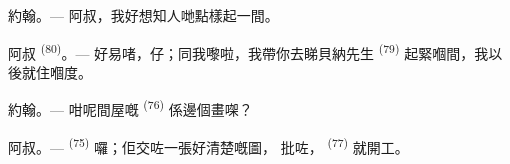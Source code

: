 %
%
%
%
%

\VUsaut{6.0mm}
\VUsaut{1.4mm}
\VUsaut{2.2mm}

\VUsaut{3.0mm}

\textsc{約翰}。--- 阿叔，我好想知人哋點樣起一間。

\textsc{阿叔} \textsuperscript{(80)}。--- 好易啫，仔；同我嚟啦，我帶你去睇貝納先生
\textsuperscript{(79)} 起緊嗰間，我以後就住嗰度。

\textsc{約翰}。--- 咁呢間屋嘅 \textsuperscript{(76)} 係邊個畫㗎？

\textsc{阿叔}。---  \textsuperscript{(75)} 囉；佢交咗一張好清楚嘅圖，
批咗， \textsuperscript{(77)} 就開工。

